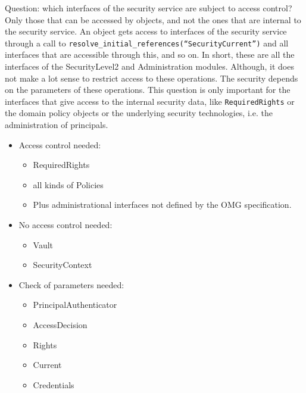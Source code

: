 Question: which interfaces of the security service are subject to access
control? \\
Only those that can be accessed by objects, and not the ones that are internal
to the security service.  An object gets access to interfaces of the security
service through a call to
\texttt{resolve\_initial\_references(``SecurityCurrent'')} and all interfaces
that are accessible through this, and so on.  In short, these are all the
interfaces of the SecurityLevel2 and Administration modules.  Although, it does
not make a lot sense to restrict access to these operations.  The security
depends on the parameters of these operations.  This question is only important
for the interfaces that give access to the internal security data, like
\texttt{RequiredRights} or the domain policy objects or the underlying security
technologies, i.e. the administration of principals.

\begin{itemize}
\item Access control needed:
  \begin{itemize}
  \item RequiredRights
  \item all kinds of Policies
  \item Plus administrational interfaces not defined by the OMG specification.
  \end{itemize}
\item No access control needed:
  \begin{itemize}
  \item Vault
  \item SecurityContext
  \end{itemize}
\item Check of parameters needed:
  \begin{itemize}
  \item PrincipalAuthenticator
  \item AccessDecision
  \item Rights
  \item Current
  \item Credentials
  \end{itemize}
\end{itemize}



